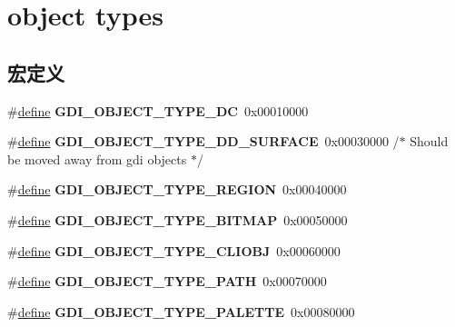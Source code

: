 \hypertarget{group___g_d_i}{}\section{object types}
\label{group___g_d_i}
\subsection*{宏定义}
\begin{DoxyCompactItemize}
\item 
\mbox{\label{group___g_d_i_ga38ddf9b3a3aab5a0b9940dd479d4a989}} 
\#\hyperlink{structdefine}{define} {\bfseries G\+D\+I\+\_\+\+O\+B\+J\+E\+C\+T\+\_\+\+T\+Y\+P\+E\+\_\+\+DC}~0x00010000
\item 
\mbox{\label{group___g_d_i_gaf2ac2ed75623258d89bffb78c08a065d}} 
\#\hyperlink{structdefine}{define} {\bfseries G\+D\+I\+\_\+\+O\+B\+J\+E\+C\+T\+\_\+\+T\+Y\+P\+E\+\_\+\+D\+D\+\_\+\+S\+U\+R\+F\+A\+CE}~0x00030000 /$\ast$ Should be moved away from gdi objects $\ast$/
\item 
\mbox{\label{group___g_d_i_ga019cd0b68bd26af6be704f851c27c157}} 
\#\hyperlink{structdefine}{define} {\bfseries G\+D\+I\+\_\+\+O\+B\+J\+E\+C\+T\+\_\+\+T\+Y\+P\+E\+\_\+\+R\+E\+G\+I\+ON}~0x00040000
\item 
\mbox{\label{group___g_d_i_ga9cc95d92873504b5ee1b1e79ea01ce1d}} 
\#\hyperlink{structdefine}{define} {\bfseries G\+D\+I\+\_\+\+O\+B\+J\+E\+C\+T\+\_\+\+T\+Y\+P\+E\+\_\+\+B\+I\+T\+M\+AP}~0x00050000
\item 
\mbox{\label{group___g_d_i_ga064882327bd28f9c3e5aca4f19c511ef}} 
\#\hyperlink{structdefine}{define} {\bfseries G\+D\+I\+\_\+\+O\+B\+J\+E\+C\+T\+\_\+\+T\+Y\+P\+E\+\_\+\+C\+L\+I\+O\+BJ}~0x00060000
\item 
\mbox{\label{group___g_d_i_ga8bf949a57cab0ac0fc728d04970a8cbc}} 
\#\hyperlink{structdefine}{define} {\bfseries G\+D\+I\+\_\+\+O\+B\+J\+E\+C\+T\+\_\+\+T\+Y\+P\+E\+\_\+\+P\+A\+TH}~0x00070000
\item 
\mbox{\label{group___g_d_i_gab9110cc6f7f0b4841fe7e3b3a67a72fe}} 
\#\hyperlink{structdefine}{define} {\bfseries G\+D\+I\+\_\+\+O\+B\+J\+E\+C\+T\+\_\+\+T\+Y\+P\+E\+\_\+\+P\+A\+L\+E\+T\+TE}~0x00080000

\end{DoxyCompactItemize}
